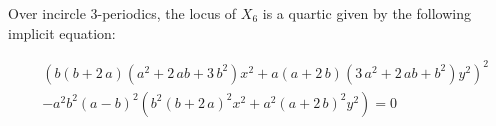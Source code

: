 \begin{proposition}
Over incircle 3-periodics, the locus of $X_6$ is a quartic given by the following implicit equation:

\begin{align*}
    &   \left( b \left( b+2\,a \right)  \left( {a}^{2}+2\,ab+3\,{b}^{2}
 \right)  {x}^{2}+a \left( a+2\,b \right)  \left( 3\,{a}^{2}+2\,ab+{b}
^{2} \right) {y}^{2} \right) ^{2}\\
&-{a}^{2}{b}^{2} \left( a-b \right) ^{
2} \left( {b}^{2} \left( b+2\,a \right) ^{2}{x}^{2}+{a}^{2} \left( a+2
\,b \right) ^{2}{y}^{2} \right) =0
\end{align*}
\end{proposition}


